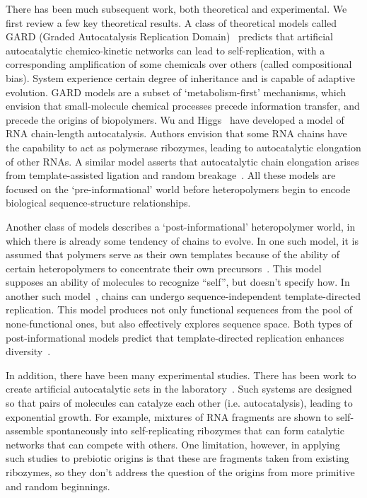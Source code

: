\documentclass[journal=jacsat,manuscript=article,layout=twocolumn]{achemso}
\begin{document}
 There has been much subsequent work, both theoretical and experimental.  We first review a few key 
theoretical results.  A class of theoretical models called GARD (Graded Autocatalysis Replication 
Domain)~\cite{segre1998graded,Segre2000,Markovitch2012} predicts that artificial autocatalytic 
chemico-kinetic networks can lead to self-replication, with a corresponding amplification of some 
chemicals over others (called compositional bias). System experience certain degree of inheritance 
and is capable of adaptive evolution.  GARD models are a subset of `metabolism-first' mechanisms, 
which envision that small-molecule chemical processes precede information transfer, and precede the 
origins of biopolymers.  Wu and Higgs~\cite{Wu2009} have developed a model of RNA chain-length 
autocatalysis.  Authors envision that some RNA chains have the capability to act as polymerase 
ribozymes, leading to autocatalytic elongation of other RNAs.  A similar model asserts that 
autocatalytic chain elongation arises from template-assisted ligation and random 
breakage~\cite{Tkachenko2014}.  All these models are focused on the `pre-informational' world before 
heteropolymers begin to encode biological sequence-structure relationships.  
 
 Another class of models describes a `post-informational' heteropolymer world, in which there is 
already some tendency of chains to evolve.  In one such model, it is assumed that polymers serve as 
their own templates because of the ability of certain heteropolymers to concentrate their own 
precursors~\cite{nowak2008prevolutionary,Ohtsuki2009,Chen2012,Derr2012}.  This model supposes an 
ability of molecules to recognize ``self'', but doesn't specify how.  In another such 
model~\cite{Walker2012}, chains can undergo sequence-independent template-directed replication.  
This model produces not only functional sequences from the pool of none-functional ones, but also 
effectively explores sequence space.  Both types of post-informational models predict that 
template-directed replication enhances diversity~\cite{Derr2012}.  
 
 In addition, there have been many experimental studies.  There has been work to create artificial 
autocatalytic sets in the laboratory~\cite{VonKiedrowski1986,Lincoln2009,Vaidya2012}. Such systems 
are designed so that pairs of molecules can catalyze each other (i.e. autocatalysis), leading to 
exponential growth.  For example, mixtures of RNA fragments are shown to self-assemble spontaneously 
into self-replicating ribozymes that can form catalytic networks that can compete with others.  One 
limitation, however, in applying such studies to prebiotic origins is that these are fragments taken 
from existing ribozymes, so they don't address the question of the origins from more primitive and 
random beginnings.
 
\end{document}
